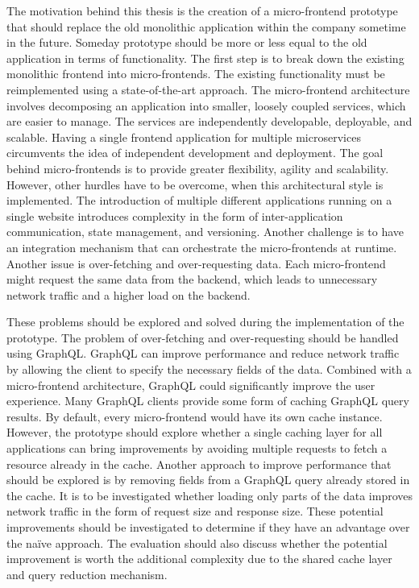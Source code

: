 The motivation behind this thesis is the creation of a micro-frontend prototype that should replace the old monolithic application within the company sometime in the future. Someday prototype should be more or less equal to the old application in terms of functionality. The first step is to break down the existing monolithic frontend into micro-frontends. The existing functionality must be reimplemented using a state-of-the-art approach. The micro-frontend architecture involves decomposing an application into smaller, loosely coupled services, which are easier to manage. The services are independently developable, deployable, and scalable. Having a single frontend application for multiple microservices circumvents the idea of independent development and deployment. The goal behind micro-frontends is to provide greater flexibility, agility and scalability. However, other hurdles have to be overcome, when this architectural style is implemented. The introduction of multiple different applications running on a single website introduces complexity in the form of inter-application communication, state management, and versioning. Another challenge is to have an integration mechanism that can orchestrate the micro-frontends at runtime. Another issue is over-fetching and over-requesting data. Each micro-frontend might request the same data from the backend, which leads to unnecessary network traffic and a higher load on the backend.

\bigskip

\noindent These problems should be explored and solved during the implementation of the prototype. The problem of over-fetching and over-requesting should be handled using GraphQL. GraphQL can improve performance and reduce network traffic by allowing the client to specify the necessary fields of the data. Combined with a micro-frontend architecture, GraphQL could significantly improve the user experience. Many GraphQL clients provide some form of caching GraphQL query results. By default, every micro-frontend would have its own cache instance. However, the prototype should explore whether a single caching layer for all applications can bring improvements by avoiding multiple requests to fetch a resource already in the cache. Another approach to improve performance that should be explored is by removing fields from a GraphQL query already stored in the cache. It is to be investigated whether loading only parts of the data improves network traffic in the form of request size and response size. These potential improvements should be investigated to determine if they have an advantage over the naïve approach. The evaluation should also discuss whether the potential improvement is worth the additional complexity due to the shared cache layer and query reduction mechanism.

